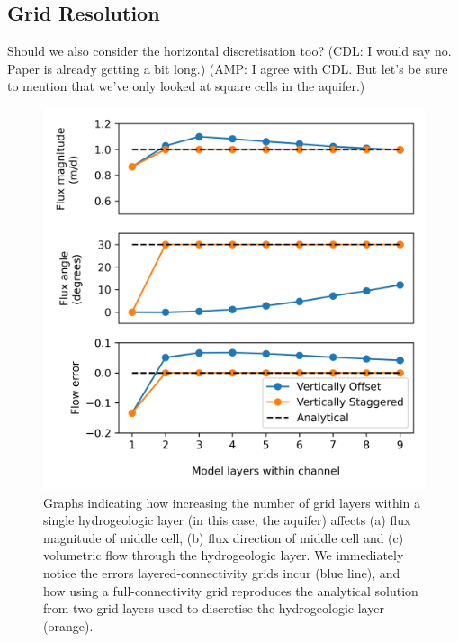 \documentclass{article}
\begin{document}
\subsection{Grid Resolution}

{\color{red} Should we also consider the horizontal discretisation too? (CDL: I would say no.  Paper is already getting a bit long.) (AMP: I agree with CDL.  But let's be sure to mention that we've only looked at square cells in the aquifer.)}

\begin{figure}
	\begin{center}
	\includegraphics[scale=0.9]{../figures/fig3paper.png}
	\caption{Graphs indicating how increasing the number of grid layers within a single hydrogeologic layer (in this case, the aquifer) affects (a) flux magnitude of middle cell, (b) flux direction of middle cell and (c) volumetric flow through the hydrogeologic layer. We immediately notice the errors layered-connectivity grids incur (blue line), and how using a full-connectivity grid reproduces the analytical solution from two grid layers used to discretise the hydrogeologic layer (orange).}
	\label{fig:fig3}
	\end{center}
\end{figure}
\end{document}
